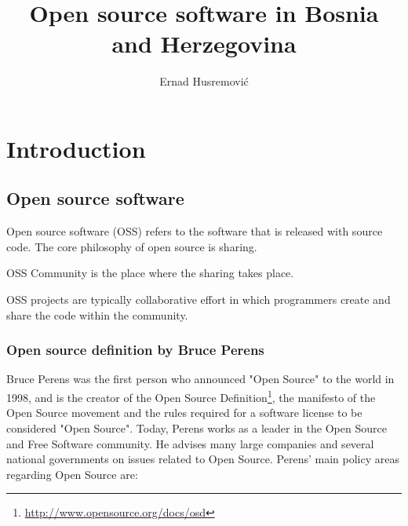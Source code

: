 \documentclass[times, utf8, seminar]{fit}
\begin{document}
\title{Open source software in Bosnia and Herzegovina}

\author{Ernad Husremović}


\maketitle

\tableofcontents

\newpage

%
%


\chapter{Introduction}

\section{Open source software}

Open source software (OSS) refers to the software that is released with source code. The core philosophy of open source is  sharing.

OSS Community is the place where the sharing takes place.

OSS projects are typically collaborative effort in which programmers create and share the code within the community.

\subsection{Open source definition by Bruce Perens}
Bruce Perens was the first person who announced "Open Source" to the world in 1998, and is the creator of the Open Source Definition\footnote{\url{http://www.opensource.org/docs/osd}}, the manifesto of the Open Source movement and the rules required for a software license to be considered "Open Source"\citep{web:perens}. Today, Perens works as a leader in the Open Source and Free Software community. He advises many large companies and several national governments on issues related to Open Source. Perens' main policy areas regarding Open Source are:
\end{document}
